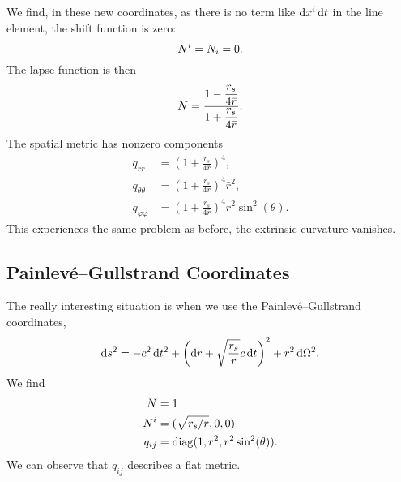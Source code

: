 We find, in these new coordinates, as there is no term like $\mathrm{d} x^{i}\,\mathrm{d} t$
in the line element, the shift function is zero:
\begin{equation}
N^{i}=N_{i}=0.
\end{equation}
The lapse function is then
\begin{equation}
N = \frac{\displaystyle 1 - \frac{r_{s}}{4\bar{r}}}{\displaystyle 1 + \frac{r_{s}}{4\bar{r}}}.
\end{equation}
The spatial metric has nonzero components
\begin{subequations}
\begin{align}
q_{rr} &= \left(1 + \frac{r_{s}}{4\bar{r}}\right)^{4},\\
q_{\theta\theta} &= \left(1 + \frac{r_{s}}{4\bar{r}}\right)^{4}\bar{r}^{2},\\
q_{\varphi\varphi} &= \left(1 + \frac{r_{s}}{4\bar{r}}\right)^{4}\bar{r}^{2}\sin^{2}(\theta).
\end{align}
\end{subequations}
This experiences the same problem as before, the extrinsic curvature
vanishes.

\subsection{Painlev\'{e}--Gullstrand Coordinates}
The really interesting situation is when we use the
Painlev\'{e}--Gullstrand coordinates,
\begin{equation}
\mathrm{d} s^{2} = -c^{2}\,\mathrm{d} t^{2} + \left(\mathrm{d} r + \sqrt{\frac{r_{s}}{r}}c\,\mathrm{d} t\right)^{2}
+r^{2}\,\mathrm{d}\Omega^{2}.
\end{equation}
We find
\begin{subequations}
\begin{align}
N &= 1\\
N^{i} &= (\sqrt{r_{s}/r}, 0, 0)\\
q_{ij} &= \mathrm{diag}(1,r^{2},r^{2}\sin^{2}(\theta)).
\end{align}
\end{subequations}
We can observe that $q_{ij}$ describes a flat metric.

